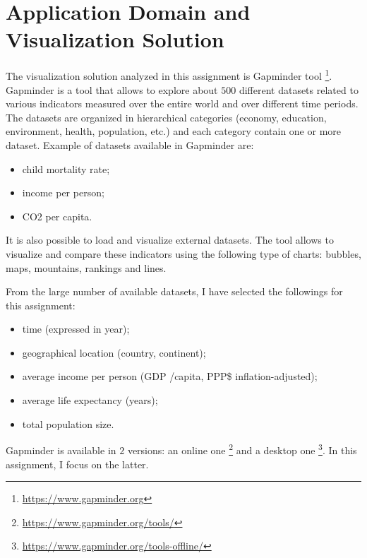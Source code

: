 \section{Application Domain and Visualization Solution}
\label{sec:visualization_solution}

The visualization solution analyzed in this assignment is Gapminder tool \footnote{\url{https://www.gapminder.org}}.
Gapminder is a tool that allows to explore about $500$ different datasets related to various indicators measured over the entire world and over different time periods.
The datasets are organized in hierarchical categories (economy, education, environment, health, population, etc.) and each category contain one or more dataset.
Example of datasets available in Gapminder are:
\begin{itemize}
    \item child mortality rate;
    \item income per person;
    \item CO2 per capita.
\end{itemize}
It is also possible to load and visualize external datasets.
The tool allows to visualize and compare these indicators using the following type of charts:
bubbles, maps, mountains, rankings and lines.

From the large number of available datasets, I have selected the followings for this assignment:
\begin{itemize}
    \item time (expressed in year);
    \item geographical location (country, continent);
    \item average income per person (GDP /capita, PPP\$ inflation-adjusted);
    \item average life expectancy (years);
    \item total population size.
\end{itemize}

Gapminder is available in $2$ versions: an online one \footnote{\url{https://www.gapminder.org/tools/}} and a desktop one \footnote{\url{https://www.gapminder.org/tools-offline/}}.
In this assignment, I focus on the latter.
